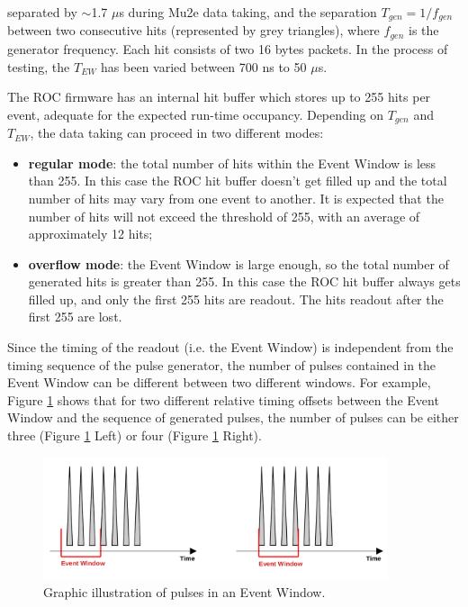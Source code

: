    separated by 
    $\sim$1.7 $\mu$s during Mu2e data taking, and 
    the separation $T_{gen}=1/f_{gen}$ between 
    two consecutive hits (represented by grey triangles), 
    where $f_{gen}$ is the generator frequency. 
    Each hit consists of two 16 bytes packets.
    In the process of testing, the $T_{EW}$ 
    has been varied between 700 ns to 50  $\mu$s. 

    The ROC firmware has an internal hit buffer 
    which stores up to 255 hits per event, adequate 
    for the expected run-time occupancy. 
    Depending on $T_{gen}$ and $T_{EW}$, the data 
    taking can proceed in two different modes:
    \begin{itemize}
      \item \textbf{regular mode}: the total number of hits 
      within the Event Window is less than 255.
      In this case the ROC hit buffer doesn't get filled up 
      and the total number of 
      hits may vary from one event to another. It is 
      expected that the number 
      of hits will not exceed the threshold of 255, 
      with an average of approximately 12 hits;
    \item \textbf{overflow mode}: the Event Window 
    is large enough, 
    so the total number of generated hits is 
      greater than 255. In this case
      the ROC hit buffer always gets filled up, and only 
      the first 255 hits are readout. 
      The hits readout after the first 255 are lost.
    \end{itemize}
   
    Since the timing of the readout (i.e. the Event Window) 
    is independent from the timing sequence 
    of the pulse generator, the number of pulses contained in 
    the Event Window can be different between two different 
    windows. 
    For example, Figure \ref{fig:timing} shows 
    that for two different relative timing offsets between 
    the Event Window and the sequence of generated pulses, 
    the number of pulses can be 
    either three (Figure \ref{fig:timing} Left) 
    or four (Figure \ref{fig:timing} Right).

    \begin{figure}[!h]
    \centering
    \includegraphics[width =0.9\textwidth]{figures/png/finalimg.png}
    \caption[Graphic illustration of pulses in an Event Window.]{Graphic illustration of pulses in an Event Window.}
    \label{fig:timing}
    \end{figure}

